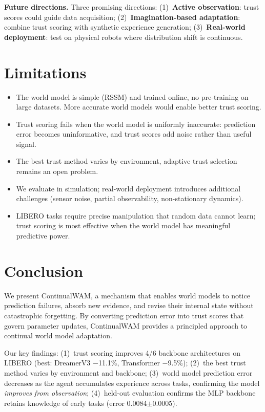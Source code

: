 \documentclass{article}
\begin{document}
\textbf{Future directions.} Three promising directions: (1)~\textbf{Active observation}: trust scores could guide data acquisition; (2)~\textbf{Imagination-based adaptation}: combine trust scoring with synthetic experience generation; (3)~\textbf{Real-world deployment}: test on physical robots where distribution shift is continuous.

\section{Limitations}

\begin{itemize}
\item The world model is simple (RSSM) and trained online, no pre-training on large datasets. More accurate world models would enable better trust scoring.
\item Trust scoring fails when the world model is uniformly inaccurate: prediction error becomes uninformative, and trust scores add noise rather than useful signal.
\item The best trust method varies by environment, adaptive trust selection remains an open problem.
\item We evaluate in simulation; real-world deployment introduces additional challenges (sensor noise, partial observability, non-stationary dynamics).
\item LIBERO tasks require precise manipulation that random data cannot learn; trust scoring is most effective when the world model has meaningful predictive power.
\end{itemize}

\section{Conclusion}

We present ContinualWAM, a mechanism that enables world models to notice prediction failures, absorb new evidence, and revise their internal state without catastrophic forgetting. By converting prediction error into trust scores that govern parameter updates, ContinualWAM provides a principled approach to continual world model adaptation.

Our key findings: (1)~trust scoring improves 4/6 backbone architectures on LIBERO (best: DreamerV3 $-$11.1\%, Transformer $-$9.5\%); (2)~the best trust method varies by environment and backbone; (3)~world model prediction error decreases as the agent accumulates experience across tasks, confirming the model \emph{improves from observation}; (4)~held-out evaluation confirms the MLP backbone retains knowledge of early tasks (error 0.0084$\pm$0.0005).
\end{document}
